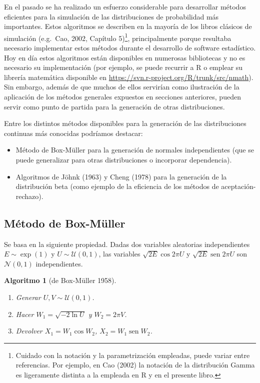 \documentclass[
]{book}
\theoremstyle{break}
\newtheorem{conjecture}{Algoritmo}[chapter]
\theoremstyle{nonumberplain}
\begin{document}
En el pasado se ha realizado un esfuerzo considerable para desarrollar métodos eficientes para la simulación de las distribuciones de probabilidad más importantes.
Estos algoritmos se describen en la mayoría de los libros clásicos de simulación (e.g.~Cao, 2002, Capítulo 5)\footnote{Cuidado con la notación y la parametrización empleadas, puede variar entre referencias. Por ejemplo, en Cao (2002) la notación de la distribución Gamma es ligeramente distinta a la empleada en R y en el presente libro.}, principalmente porque resultaba necesario implementar estos métodos durante el desarrollo de software estadístico.
Hoy en día estos algoritmos están disponibles en numerosas bibliotecas y no es necesario su implementación (por ejemplo, se puede recurrir a R o emplear su librería matemática disponible en \url{https://svn.r-project.org/R/trunk/src/nmath}).
Sin embargo, además de que muchos de ellos servirían como ilustración de la aplicación de los métodos generales expuestos en secciones anteriores, pueden servir como punto de partida para la generación de otras distribuciones.

Entre los distintos métodos disponibles para la generación de las distribuciones continuas más conocidas podríamos destacar:

\begin{itemize}
\item
  Método de Box-Müller para la generación de normales independientes (que se puede generalizar para otras distribuciones o incorporar dependencia).
\item
  Algoritmos de Jöhnk (1963) y Cheng (1978) para la generación de la distribución beta (como ejemplo de la eficiencia de los métodos de aceptación-rechazo).
\end{itemize}

\hypertarget{muxe9todo-de-box-muxfcller}{%
\subsection{Método de Box-Müller}\label{muxe9todo-de-box-muxfcller}}

Se basa en la siguiente propiedad. Dadas dos variables aleatorias independientes \(E \sim \exp\left( 1\right)\) y
\(U \sim \mathcal{U}( 0, 1 )\), las variables
\(\sqrt{2E} \cos 2\pi U\) y \(\sqrt{2E}\operatorname{sen} 2\pi U\) son
\(\mathcal{N}( 0, 1 )\) independientes.

\begin{conjecture}[de Box-Müller 1958]
\protect\hypertarget{cnj:box-muller}{}\label{cnj:box-muller}

\begin{enumerate}
\def\labelenumi{\arabic{enumi}.}
\item
  Generar \(U,V\sim \mathcal{U}(0, 1)\).
\item
  Hacer \(W_1=\sqrt{-2\ln U}\) y \(W_2=2\pi V\).
\item
  Devolver \(X_1=W_1\cos W_2\), \(X_2=W_1\operatorname{sen}W_2\).
\end{enumerate}

\end{conjecture}
\end{document}
